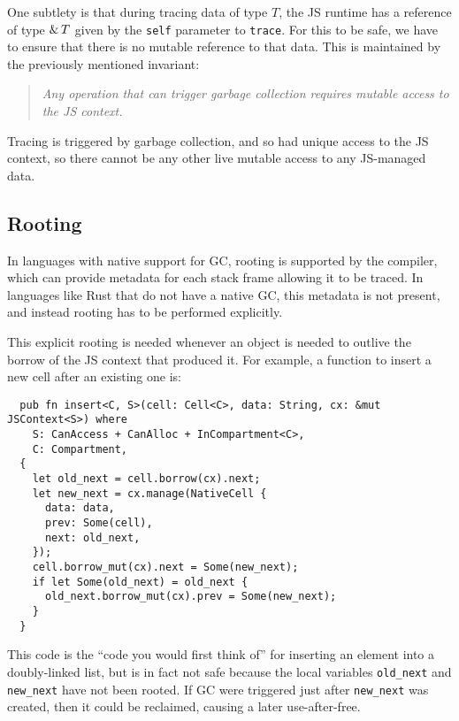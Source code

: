 One subtlety is that during tracing data of type $T$, the JS runtime
has a reference of type $\&\,{T}$ given by the \verb|self| parameter
to \verb|trace|. For this to be safe, we have to ensure that there is
no mutable reference to that data. This is maintained by the
previously mentioned invariant:
\begin{quote}\em
  Any operation that can trigger garbage collection
  requires mutable access to the JS context.
\end{quote}
Tracing is triggered by garbage collection, and so had unique access
to the JS context, so there cannot be any other live mutable access
to any JS-managed data.

\subsection{Rooting}

In languages with native support for GC, rooting is
supported by the compiler, which can provide metadata for
each stack frame allowing it to be traced. In languages like
Rust that do not have a native GC, this metadata is not
present, and instead rooting has to be performed explicitly.

This explicit rooting is needed whenever an object is
needed to outlive the borrow of the JS context that produced
it. For example, a function to insert a new cell after
an existing one is:
\begin{verbatim}
  pub fn insert<C, S>(cell: Cell<C>, data: String, cx: &mut JSContext<S>) where
    S: CanAccess + CanAlloc + InCompartment<C>,
    C: Compartment,
  {
    let old_next = cell.borrow(cx).next;
    let new_next = cx.manage(NativeCell {
      data: data,
      prev: Some(cell),
      next: old_next,
    });
    cell.borrow_mut(cx).next = Some(new_next);
    if let Some(old_next) = old_next {
      old_next.borrow_mut(cx).prev = Some(new_next);
    }
  }
\end{verbatim}
This code is the ``code you would first think of'' for inserting an
element into a doubly-linked list, but is in fact not safe because
the local variables \verb|old_next| and \verb|new_next| have not been
rooted. If GC were triggered just after \verb|new_next| was created,
then it could be reclaimed, causing a later use-after-free.

